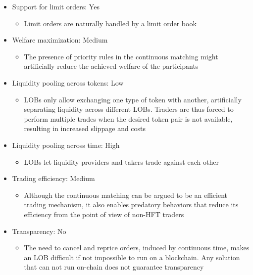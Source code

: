 \documentclass[11pt, reqno]{amsart}
\theoremstyle{definition}
\theoremstyle{remark}
\begin{document}
\begin{itemize}
    \item Support for limit orders: Yes
          \begin{itemize}
              \item Limit orders are naturally handled by a limit order book
          \end{itemize}
    \item Welfare maximization: Medium
          \begin{itemize}
              \item The presence of priority rules in the continuous matching
                    might artificially reduce the achieved welfare of the participants
          \end{itemize}
    \item Liquidity pooling across tokens: Low
          \begin{itemize}
              \item LOBs only allow exchanging one type of token with another,
                    artificially separating liquidity across different LOBs.
                    Traders are thus forced to perform multiple trades when the
                    desired token pair is not available, resulting in increased
                    slippage and costs
          \end{itemize}
    \item Liquidity pooling across time: High
          \begin{itemize}
              \item LOBs let liquidity providers and takers trade against each other
          \end{itemize}
    \item Trading efficiency: Medium
          \begin{itemize}
              \item Although the continuous matching can be argued to be an efficient
                    trading mechanism, it also enables predatory behaviors that reduce
                    its efficiency from the point of view of non-HFT traders
          \end{itemize}
    \item Transparency: No
          \begin{itemize}
              \item The need to cancel and reprice orders, induced by continuous
                    time, makes an LOB difficult if not impossible to run on a blockchain.
                    Any solution that can not run on-chain does not guarantee transparency

\end{itemize}
\end{itemize}
\end{document}
